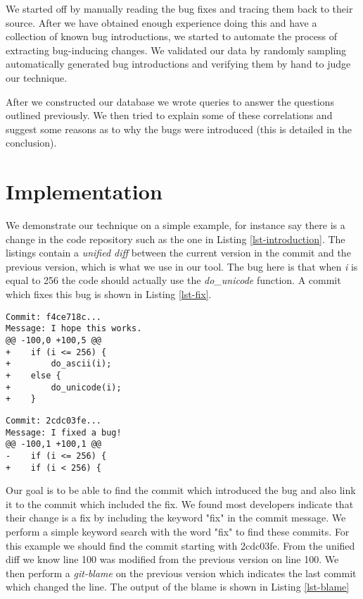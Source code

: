 We started off by manually reading the bug fixes and tracing them back
to their source. After we have obtained enough experience doing this
and have a collection of known bug introductions, we started to
automate the process of extracting bug-inducing changes. We validated
our data by randomly sampling automatically generated bug
introductions and verifying them by hand to judge our technique.

After we constructed our database we wrote queries to answer the questions
outlined previously. We then tried to explain some of these
correlations and suggest some reasons as to why the bugs were introduced (this
is detailed in the conclusion).

\section{Implementation}
\label{sec-impl}

We demonstrate our technique on a simple example, for instance say
there is a change in the code repository such as the one in Listing
\ref{lst-introduction}. The listings contain a {\em unified diff}
between the current version in the commit and the previous version,
which is what we use in our tool. The bug here is that when {\em i} is
equal to 256 the code should actually use the {\em do\_unicode}
function. A commit which fixes this bug is shown in Listing \ref{lst-fix}.

\newpage

\begin{lstlisting}[caption=An example bug introduction,label=lst-introduction, frame=single]
Commit: f4ce718c...
Message: I hope this works.
@@ -100,0 +100,5 @@
+    if (i <= 256) {
+        do_ascii(i);
+    else {
+        do_unicode(i);
+    }
\end{lstlisting}

\begin{lstlisting}[caption=An example bug fix,label=lst-fix,frame=single]
Commit: 2cdc03fe...
Message: I fixed a bug!
@@ -100,1 +100,1 @@
-    if (i <= 256) {
+    if (i < 256) {
\end{lstlisting}

Our goal is to be able to find the commit which introduced the bug and
also link it to the commit which included the fix. We found most
developers indicate that their change is a fix by including the keyword "fix"
in the commit message. We perform a simple keyword search with the word "fix"
to find these commits. For this example we should find the commit
starting with 2cdc03fe. From the unified diff we know line 100 was
modified from the previous version on line 100. We then perform a {\em
  git-blame} on the previous version which indicates the last commit
which changed the line. The output of the blame is shown in Listing
\ref{lst-blame}

